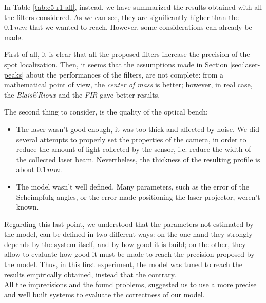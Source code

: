 In Table \ref{tab:c5-r1-all}, instead, we have summarized the results obtained with all the filters considered. As we can see, they are significantly higher than the $0.1 \, mm$ that we wanted to reach. However, some considerations can already be made.
  
  
First of all, it is clear that all the proposed filters increase the precision of the spot localization. Then, it seems that the assumptions made in Section \ref{sec:laser-peaks} about the performances of the filters, are not complete: from a mathematical point of view, the \textit{center of mass} is better; however, in real case, the \textit{Blais\&Rioux} and the \textit{FIR} gave better results.

The second thing to consider, is the quality of the optical bench:
  \begin{itemize}
    \item The laser wasn't good enough, it was too thick and affected by noise. We did several attempts to properly set the properties of the camera, in order to reduce the amount of light collected by the sensor, i.e. reduce the width of the collected laser beam. Nevertheless, the thickness of the resulting profile is about $0.1 \, mm$.
    \item The model wasn't well defined. Many parameters, such as the error of the Scheimpfulg angles, or the error made positioning the laser projector, weren't known.
  \end{itemize}
Regarding this last point, we understood that the parameters not estimated by the model, can be defined in two different ways: on the one hand they strongly depends by the system itself, and by how good it is build; on the other, they allow to evaluate how good it must be made to reach the precision proposed by the model. Thus, in this first experiment, the model was tuned to reach the results empirically obtained, instead that the contrary. \\

All the imprecisions and the found problems, suggested us to use a more precise and well built systems to evaluate the correctness of our model.
